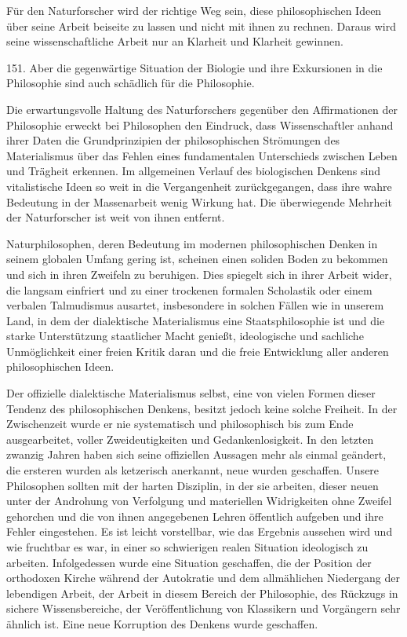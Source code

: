 \documentclass[11pt,a4paper]{book}
\begin{document}
Für den Naturforscher wird der richtige Weg sein, diese philosophischen Ideen über seine Arbeit beiseite zu lassen und nicht mit ihnen zu rechnen. Daraus wird seine wissenschaftliche Arbeit nur an Klarheit und Klarheit gewinnen.



151. Aber die gegenwärtige Situation der Biologie und ihre Exkursionen in die Philosophie sind auch schädlich für die Philosophie.



Die erwartungsvolle Haltung des Naturforschers gegenüber den Affirmationen der Philosophie erweckt bei Philosophen den Eindruck, dass Wissenschaftler anhand ihrer Daten die Grundprinzipien der philosophischen Strömungen des Materialismus über das Fehlen eines fundamentalen Unterschieds zwischen Leben und Trägheit erkennen. Im allgemeinen Verlauf des biologischen Denkens sind vitalistische Ideen so weit in die Vergangenheit zurückgegangen, dass ihre wahre Bedeutung in der Massenarbeit wenig Wirkung hat. Die überwiegende Mehrheit der Naturforscher ist weit von ihnen entfernt.



Naturphilosophen, deren Bedeutung im modernen philosophischen Denken in seinem globalen Umfang gering ist, scheinen einen soliden Boden zu bekommen und sich in ihren Zweifeln zu beruhigen. Dies spiegelt sich in ihrer Arbeit wider, die langsam einfriert und zu einer trockenen formalen Scholastik oder einem verbalen Talmudismus ausartet, insbesondere in solchen Fällen wie in unserem Land, in dem der dialektische Materialismus eine Staatsphilosophie ist und die starke Unterstützung staatlicher Macht genießt, ideologische und sachliche Unmöglichkeit einer freien Kritik daran und die freie Entwicklung aller anderen philosophischen Ideen.



Der offizielle dialektische Materialismus selbst, eine von vielen Formen dieser Tendenz des philosophischen Denkens, besitzt jedoch keine solche Freiheit. In der Zwischenzeit wurde er nie systematisch und philosophisch bis zum Ende ausgearbeitet, voller Zweideutigkeiten und Gedankenlosigkeit. In den letzten zwanzig Jahren haben sich seine offiziellen Aussagen mehr als einmal geändert, die ersteren wurden als ketzerisch anerkannt, neue wurden geschaffen. Unsere Philosophen sollten mit der harten Disziplin, in der sie arbeiten, dieser neuen unter der Androhung von Verfolgung und materiellen Widrigkeiten ohne Zweifel gehorchen und die von ihnen angegebenen Lehren öffentlich aufgeben und ihre Fehler eingestehen. Es ist leicht vorstellbar, wie das Ergebnis aussehen wird und wie fruchtbar es war, in einer so schwierigen realen Situation ideologisch zu arbeiten. Infolgedessen wurde eine Situation geschaffen, die der Position der orthodoxen Kirche während der Autokratie und dem allmählichen Niedergang der lebendigen Arbeit, der Arbeit in diesem Bereich der Philosophie, des Rückzugs in sichere Wissensbereiche, der Veröffentlichung von Klassikern und Vorgängern sehr ähnlich ist. Eine neue Korruption des Denkens wurde geschaffen.
\end{document}
